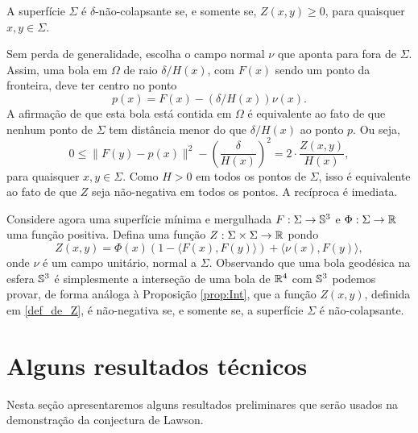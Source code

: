 \begin{proposicao}\label{prop:Int}
A superf\'icie $\Sigma$ \'e $\delta$-n\~ao-colapsante se, e somente
se, $Z(x,y)\geq0$, para quaisquer $x,y\in\Sigma$.
\end{proposicao}
\begin{demonstracao}
Sem perda de generalidade, escolha o campo normal $\nu$ que
aponta para fora de $\Sigma$. Assim, uma bola em $\Omega$ de
raio $\delta/H(x)$, com $F(x)$ sendo um ponto da fronteira, deve
ter centro no ponto
\[
p(x) = F(x) - (\delta/H(x))\nu(x).
\]
A afirma\c c\~ao de que esta bola est\'a contida em $\Omega$
\'e equivalente ao fato de que nenhum ponto de $\Sigma$ tem
dist\^ancia menor do que $\delta/H(x)$ ao ponto $p$. Ou seja,
\[
0\leq\|F(y)-p(x)\|^2-\left(\frac{\delta}{H(x)}\right)^2 = 
2\cdot\frac{Z(x,y)}{H(x)},
\]
para quaisquer $x,y\in\Sigma$. Como $H>0$ em todos os pontos
de $\Sigma$, isso \'e equivalente ao fato de que $Z$ seja
n\~ao-negativa em todos os pontos. A rec\'iproca \'e imediata.
\end{demonstracao}

Considere agora uma superf\'icie m\'inima e mergulhada 
$F:\Sigma\to\mathbb{S}^3$ e $ \Phi: \Sigma\to\mathbb{R}$ uma função positiva. Defina
uma função $Z:\Sigma\times\Sigma\to\mathbb{R}$ pondo
\begin{equation}\label{def_de_Z}
Z(x,y) = \Phi(x) (1 - \langle F(x),F(y) \rangle ) + \langle \nu(x), F(y) \rangle,
\end{equation}
onde $\nu$ \'e um campo unitário, normal a $\Sigma$. Observando que
uma bola geod\'esica na esfera $\mathbb{S}^3$ \'e simplesmente a interseção
de uma bola de $\mathbb{R}^4$ com $\mathbb{S}^3$ podemos provar, de forma
an\'aloga \`a Proposi\c c\~ao \ref{prop:Int}, que a fun\c c\~ao $Z(x,y)$,
definida em \eqref{def_de_Z}, \'e n\~ao-negativa se, e somente se,
a superf\'icie $\Sigma$ \'e n\~ao-colapsante.




\section{Alguns resultados t\'ecnicos}

Nesta se\c c\~ao apresentaremos alguns resultados preliminares
que ser\~ao usados na demonstra\c c\~ao da conjectura de
Lawson. 

\vspace{.2cm}

